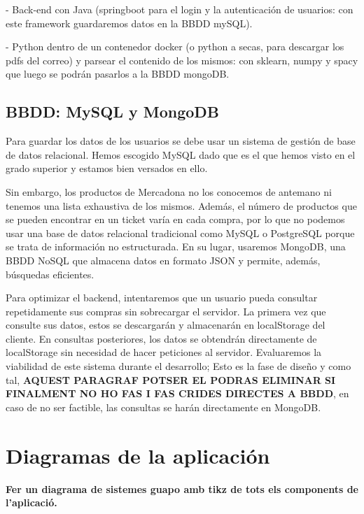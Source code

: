 \documentclass[a4paper,12pt]{report}
\begin{document}
			- Back-end con Java (springboot para el login y la autenticación de usuarios: con este framework guardaremos datos en la BBDD mySQL).
			
			- Python dentro de un contenedor docker (o python a secas, para descargar los pdfs del correo) y parsear el contenido de los mismos: con sklearn, numpy y spacy que luego se podrán pasarlos a la BBDD mongoDB.
			
		\subsection{BBDD: MySQL y MongoDB}
		
		
		Para guardar los datos de los usuarios se debe usar un sistema de gestión de base de datos relacional. Hemos escogido MySQL dado que es el que hemos visto en el grado superior y estamos bien versados en ello.
		
		Sin embargo, los productos de Mercadona no los conocemos de antemano ni tenemos una lista exhaustiva de los mismos. Además, el número de productos que se pueden encontrar en un ticket varía en cada compra, por lo que no podemos usar una base de datos relacional tradicional como MySQL o PostgreSQL porque se trata de información no estructurada. En su lugar, usaremos MongoDB, una BBDD NoSQL que almacena datos en formato JSON y permite, además, búsquedas eficientes.
		
		Para optimizar el backend, intentaremos que un usuario pueda consultar repetidamente sus compras sin sobrecargar el servidor. La primera vez que consulte sus datos, estos se descargarán y almacenarán en localStorage del cliente. En consultas posteriores, los datos se obtendrán directamente de localStorage sin necesidad de hacer peticiones al servidor. Evaluaremos la viabilidad de este sistema durante el desarrollo; Esto es la fase de diseño y como tal, \textbf{AQUEST PARAGRAF POTSER EL PODRAS ELIMINAR SI FINALMENT NO HO FAS I FAS CRIDES DIRECTES A BBDD}, en caso de no ser factible, las consultas se harán directamente en MongoDB.
		



		
		
		
		
		
		\section{Diagramas de la aplicación}
		
		\textbf{Fer un diagrama de sistemes guapo amb tikz de tots els components de l'aplicació.}
	
\end{document}
